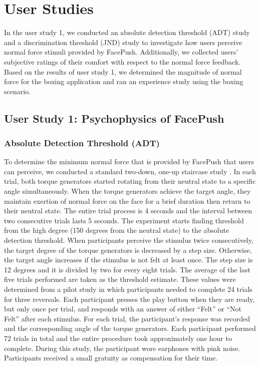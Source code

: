 \chapter{User Studies} \label{chapter:evaluation}
In the user study 1, we conducted an absolute detection threshold (ADT) study and a discrimination threshold (JND) study to investigate how users perceive normal force stimuli provided by FacePush. Additionally, we collected users' subjective ratings of their comfort with respect to the normal force feedback. Based on the results of user study 1, we determined the magnitude of normal force for the boxing application and ran an experience study using the boxing scenario.


\section{User Study 1: Psychophysics of FacePush}

\subsection{Absolute Detection Threshold (ADT) }
To determine the minimum normal force that is provided by FacePush that users can perceive, we conducted a standard two-down, one-up staircase study \cite{Lynette2012, Leek2001}. In each trial, both torque generators started rotating from their neutral state to a specific angle simultaneously. When the torque generators achieve the target angle, they maintain exertion of normal force on the face for a brief duration then return to their neutral state. The entire trial process is 4 seconds and the interval between two consecutive trials lasts 5 seconds. The experiment starts finding threshold from the high degree (150 degrees from the neutral state) to the absolute detection threshold. When participants perceive the stimulus twice consecutively, the target degree of the torque generators is decreased by a step size. Otherwise, the target angle increases if the stimulus is not felt at least once. The step size is 12 degrees and it is divided by two for every eight trials. The average of the last five trials performed are taken as the threshold estimate. These values were determined from a pilot study in which participants needed to complete 24 trials for three reversals. Each participant presses the play button when they are ready, but only once per trial, and responds with an answer of either “Felt” or “Not Felt” after each stimulus. For each trial, the participant's response was recorded and the corresponding angle of the torque generators. Each participant performed 72 trials in total and the entire procedure took approximately one hour to complete. During this study, the participant wore earphones with pink noise. Participants received a small gratuity as compensation for their time. 

